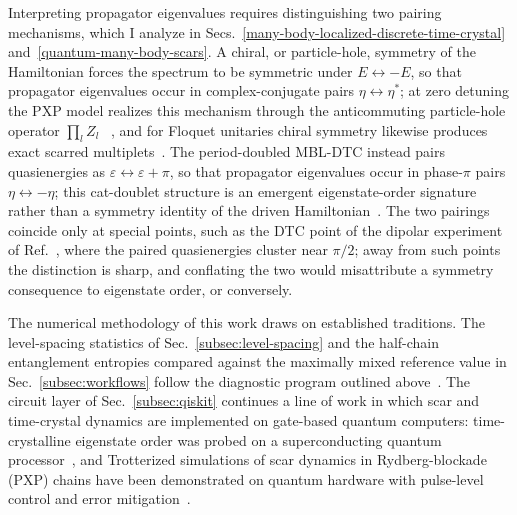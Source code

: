 \documentclass[longbibliography]{revtex4-2}
\begin{document}
Interpreting propagator eigenvalues requires distinguishing two pairing
mechanisms, which I analyze in
Secs.~\ref{many-body-localized-discrete-time-crystal}
and~\ref{quantum-many-body-scars}. A chiral, or particle-hole, symmetry
of the Hamiltonian forces the spectrum to be symmetric under
$E \leftrightarrow -E$, so that propagator eigenvalues occur in
complex-conjugate pairs $\eta \leftrightarrow \eta^{*}$; at zero
detuning the PXP model realizes this mechanism through the
anticommuting particle-hole operator $\prod_{l} Z_{l}$
~\cite{turner2018weak}, and for Floquet unitaries chiral symmetry
likewise produces exact scarred multiplets~\cite{mizuta2020exact}. The
period-doubled MBL-DTC instead pairs quasienergies as
$\varepsilon \leftrightarrow \varepsilon + \pi$, so that propagator
eigenvalues occur in phase-$\pi$ pairs $\eta \leftrightarrow -\eta$;
this cat-doublet structure is an emergent eigenstate-order signature
rather than a symmetry identity of the driven
Hamiltonian~\cite{khemani2016phase, else2016floquet, yao2017discrete}.
The two pairings coincide only at special points, such as the DTC point
of the dipolar experiment of Ref.~\cite{choi2017observation}, where the
paired quasienergies cluster near $\pi/2$; away from such points the
distinction is sharp, and conflating the two would misattribute a
symmetry consequence to eigenstate order, or conversely.

The numerical methodology of this work draws on established traditions.
The level-spacing statistics of Sec.~\ref{subsec:level-spacing} and the
half-chain entanglement entropies compared against the maximally mixed
reference value in Sec.~\ref{subsec:workflows} follow the diagnostic
program outlined above~\cite{oganesyan2007localization,
atas2013distribution, page1993average}. The circuit layer of
Sec.~\ref{subsec:qiskit} continues a line of work in which scar and
time-crystal dynamics are implemented on gate-based quantum computers:
time-crystalline eigenstate order was probed on a superconducting
quantum processor~\cite{mi2022time}, and Trotterized simulations of
scar dynamics in Rydberg-blockade (PXP) chains have been demonstrated
on quantum hardware with pulse-level control and error
mitigation~\cite{chen2022error}.
\end{document}
